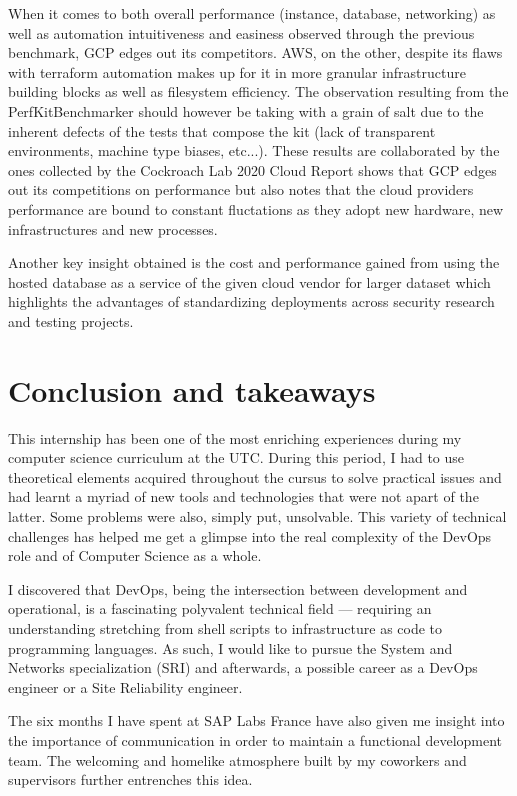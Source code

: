 \documentclass[11pt]{article}
\begin{document}
\hspace{5mm} When it comes to both overall performance (instance, database, networking) as well as automation intuitiveness and easiness observed through the previous benchmark, GCP edges out its competitors. AWS, on the other, despite its flaws with terraform automation makes up for it in more granular infrastructure building blocks as well as filesystem efficiency. The observation resulting from the PerfKitBenchmarker should however be taking with a grain of salt due to the inherent defects of the tests that compose the kit (lack of transparent environments, machine type biases, etc...). These results are collaborated by the ones collected by the Cockroach Lab 2020 Cloud Report \cite{Cloudreport} shows that GCP edges out its competitions on performance but also notes that the cloud providers performance are bound to constant fluctations as they adopt new hardware, new infrastructures and new processes. 


Another key insight obtained is the cost and performance gained from using the hosted database as a service of the given cloud vendor for larger dataset which highlights the advantages of standardizing deployments across security research and testing projects. 

\newpage
\section{Conclusion and takeaways}
\hspace{5mm} This internship has been one of the most enriching experiences during my computer science curriculum at the UTC. During this period, I had to
use theoretical elements acquired throughout the cursus to solve practical issues and had learnt a myriad of new tools and technologies that were not apart of the latter. Some problems were also, simply put, unsolvable. This variety of technical challenges has helped me get a glimpse into the real complexity of the DevOps role and of Computer Science as a whole.

I discovered that DevOps, being the intersection between development and operational, is a fascinating polyvalent technical field — requiring an understanding stretching from shell scripts to infrastructure as code to programming languages. As such, I would like to pursue the System and Networks specialization (SRI) and afterwards, a possible career as a DevOps engineer or a Site Reliability engineer.

The six months I have spent at SAP Labs France have also given me insight into the importance of communication in order to maintain a functional development team. The welcoming and homelike atmosphere built by my coworkers and supervisors further entrenches this idea.
\end{document}
